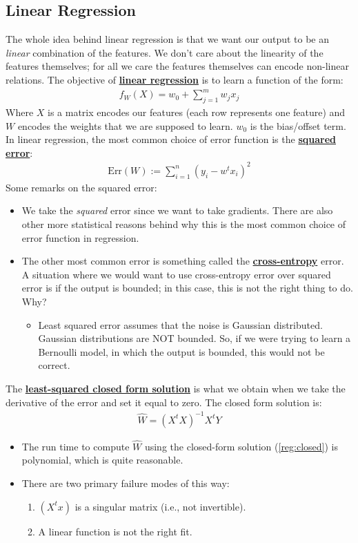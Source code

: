 \documentclass[11pt]{scrartcl}
\theoremstyle{definition}
\theoremstyle{remark}
\newcommand{\dfn}[1]{\textbf{\underline{#1}}}
\begin{document}
\subsection{Linear Regression}
The whole idea behind linear regression is that we want our output to be an \emph{linear} combination of the features. We don't care about the linearity of the features themselves; for all we care the features themselves can encode non-linear relations. The objective of \dfn{linear regression} is to learn a function of the form: 
\begin{align}
	f_W(X) = w_0  + \sum_{j=1}^m w_j x_j
\end{align}
Where $X$ is a matrix encodes our features (each row represents one feature) and $W$ encodes the weights that we are supposed to learn. $w_0$ is the bias/offset term. In linear regression, the most common choice of error function is the \dfn{squared error}: 
\begin{align*}
	\text{Err}(W) := \sum_{i=1}^n (y_i - w^t x_i)^2
\end{align*}
Some remarks on the squared error: 
\begin{itemize}[noitemsep]
	\item We take the \emph{squared} error since we want to take gradients. There are also other more statistical reasons behind why this is the most common choice of error function in regression. 
	\item The other most common error is something called the \dfn{cross-entropy} error. A situation where we would want to use cross-entropy error over squared error is if the output is bounded; in this case, this is not the right thing to do. Why? 
	\begin{itemize}[noitemsep]
		\item Least squared error assumes that the noise is Gaussian distributed. Gaussian distributions are NOT bounded. So, if we were trying to learn a Bernoulli model, in which the output is bounded, this would not be correct. 
	\end{itemize}
\end{itemize}

The \dfn{least-squared closed form solution} is what we obtain when we take the derivative of the error and set it equal to zero. The closed form solution is: 
\begin{align}\label{reg:closed} 
	\hat{W} = (X^t X)^{-1} X^t Y 	
\end{align}
\begin{itemize}[noitemsep]
	\item The run time to compute $\hat{W}$ using the closed-form solution (\ref{reg:closed}) is polynomial, which is quite reasonable.  
	\item There are two primary failure modes of this way: 
	\begin{enumerate}[noitemsep]
		\item $(X^tx)$ is a singular matrix (i.e., not invertible). 
		\item A linear function is not the right fit. 
	\end{enumerate}
\end{itemize}
\end{document}
